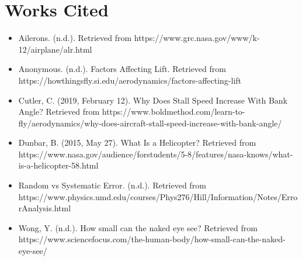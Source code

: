 \documentclass[]{article}
\theoremstyle{definition}
\begin{document}
\newpage

\section{Works Cited}

\begin{itemize}
    \item Ailerons. (n.d.). Retrieved from https://www.grc.nasa.gov/www/k-12/airplane/alr.html
    \item Anonymous. (n.d.). Factors Affecting Lift. Retrieved from https://howthingsfly.si.edu/aerodynamics/factors-affecting-lift
    \item Cutler, C. (2019, February 12). Why Does Stall Speed Increase With Bank Angle? Retrieved from https://www.boldmethod.com/learn-to-fly/aerodynamics/why-does-aircraft-stall-speed-increase-with-bank-angle/
    \item Dunbar, B. (2015, May 27). What Is a Helicopter? Retrieved from https://www.nasa.gov/audience/forstudents/5-8/features/nasa-knows/what-is-a-helicopter-58.html
    \item Random vs Systematic Error. (n.d.). Retrieved from https://www.physics.umd.edu/courses/Phys276/Hill/Information/Notes/ErrorAnalysis.html
    \item Wong, Y. (n.d.). How small can the naked eye see? Retrieved from https://www.sciencefocus.com/the-human-body/how-small-can-the-naked-eye-see/
\end{itemize}
\end{document}
